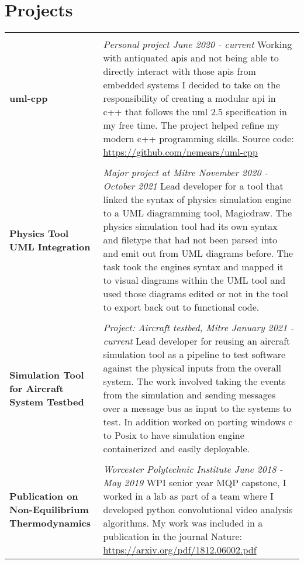 \documentclass[10pt]{article}
\begin{document}
\section*{Projects}
\begin{tabular}[t]{p{4cm} p{14cm}}
  \hline
  \multicolumn{2}{c}{} \\
  \large \textbf{uml-cpp} &
  \textit{Personal project \hfill June 2020 - current} \newline
  Working with antiquated apis and not being able to directly interact with those apis from embedded systems I decided to take on the responsibility of creating a modular api in c++ that follows the uml 2.5 specification in my free time. The project helped refine my modern c++ programming skills. Source code: \url{https://github.com/nemears/uml-cpp} \\
  \multicolumn{2}{c}{} \\
  \large \textbf{Physics Tool UML Integration} &
  \textit{Major project at Mitre \hfill November 2020 - October 2021} \newline
  Lead developer for a tool that linked the syntax of physics simulation engine to a UML diagramming tool, Magicdraw. The physics simulation tool had its own syntax and filetype that had not been parsed into and emit out from UML diagrams before. The task took the engines syntax and mapped it to visual diagrams within the UML tool and used those diagrams edited or not in the tool to export back out to functional code. \\
  \multicolumn{2}{c}{} \\
  \raggedright
  \large \textbf{Simulation Tool for Aircraft System Testbed} &
  \textit{Project: Aircraft testbed, Mitre \hfill January 2021 - current} \newline
  Lead developer for reusing an aircraft simulation tool as a pipeline to test software against the physical inputs from the overall system. The work involved taking the events from the simulation and sending messages over a message bus as input to the systems to test. In addition worked on porting windows c to Posix to have simulation engine containerized and easily deployable.\\
  \multicolumn{2}{c}{} \\
  \raggedright
  \large \textbf{Publication on Non-Equilibrium Thermodynamics} &
  \textit{Worcester Polytechnic Institute \hfill June 2018 - May 2019} \newline
  WPI senior year MQP capstone, I worked in a lab as part of a team where I developed python convolutional video analysis algorithms. My work was included in a publication in the journal Nature: \url{https://arxiv.org/pdf/1812.06002.pdf} \\
\end{tabular}
\end{document}
